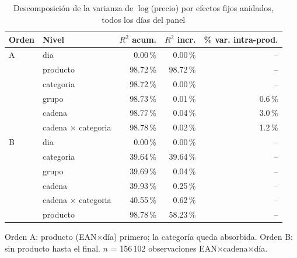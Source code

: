 \begin{table}[htbp]
\caption{Descomposici\'on de la varianza de $\log$(precio) por efectos fijos anidados, todos los d\'ias del panel}
\label{tab:varianza}
\centering\scriptsize\setlength{\tabcolsep}{3pt}
\begin{tabular}{@{}llrrr@{}}
\toprule
Orden & Nivel & $R^2$ acum. & $R^2$ incr. & \% var. intra-prod. \\
\midrule
A & dia & 0.00\,\% & 0.00\,\% & -- \\
 & producto & 98.72\,\% & 98.72\,\% & -- \\
 & categoria & 98.72\,\% & 0.00\,\% & -- \\
 & grupo & 98.73\,\% & 0.01\,\% & 0.6\,\% \\
 & cadena & 98.77\,\% & 0.04\,\% & 3.0\,\% \\
 & cadena $\times$ categoria & 98.78\,\% & 0.02\,\% & 1.2\,\% \\
\midrule
B & dia & 0.00\,\% & 0.00\,\% & -- \\
 & categoria & 39.64\,\% & 39.64\,\% & -- \\
 & grupo & 39.69\,\% & 0.04\,\% & -- \\
 & cadena & 39.93\,\% & 0.25\,\% & -- \\
 & cadena $\times$ categoria & 40.55\,\% & 0.62\,\% & -- \\
 & producto & 98.78\,\% & 58.23\,\% & -- \\
\bottomrule\end{tabular}
\par\smallskip\raggedright\scriptsize Orden A: producto (EAN$\times$d\'ia) primero; la categor\'ia queda absorbida. Orden B: sin producto hasta el final. $n$ = 156\,102 observaciones EAN$\times$cadena$\times$d\'ia.
\end{table}
